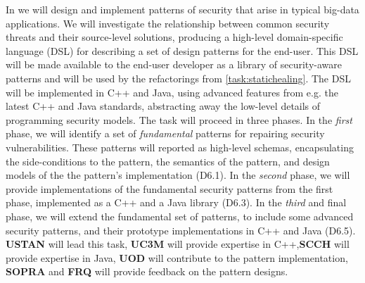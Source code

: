 \begin{Workpackage}{\thewpno}
\begin{Task}
%
%
\end{Task}

\begin{Task}
	\TaskResults{%
	}
	\TaskHeader{}
	
In \theTask{} we will design and implement patterns of security that arise in typical big-data applications. We will investigate the relationship between common security threats and their source-level solutions, producing a high-level domain-specific language (DSL) for describing a set of design patterns for the end-user. This DSL will be made available to the end-user developer as a library of security-aware patterns and will be used by the refactorings from \ref{task:statichealing}. The DSL will be implemented in C++ and Java, using advanced features from e.g. the latest C++ and Java standards, abstracting away the low-level details of programming security models.
%
The task will proceed in three phases. In the \emph{first} phase, we will identify a set of \emph{fundamental} patterns for repairing security vulnerabilities. These patterns will reported as high-level schemas, encapsulating the side-conditions to the pattern, the semantics of the pattern, and design models of the the pattern's implementation (D6.1).
In the \emph{second} phase, we will provide implementations of the fundamental security patterns from the first phase, implemented as a C++ and a Java library (D6.3). In the \emph{third} and final phase, we will extend the fundamental set of patterns, to include some advanced security patterns, and their prototype implementations in C++ and Java (D6.5).  \textbf{USTAN} will lead this task, \textbf{UC3M} will provide expertise in C++,\textbf{SCCH} will provide expertise in Java,  \textbf{UOD} will contribute to the pattern implementation, \textbf{SOPRA} and \textbf{FRQ} will provide feedback on the pattern designs. 
\end{Task}


\end{Workpackage}
